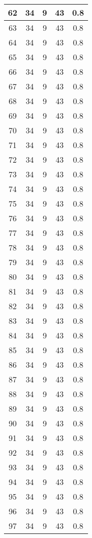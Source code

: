 \documentclass[letterpaper, 12pt]{article}
\begin{document}
\begin{longtable}{|c|c|c|c|c|}
\hline
62 & 34 & 9 & 43 & 0.8 \\
\hline
63 & 34 & 9 & 43 & 0.8 \\
\hline
64 & 34 & 9 & 43 & 0.8 \\
\hline
65 & 34 & 9 & 43 & 0.8 \\
\hline
66 & 34 & 9 & 43 & 0.8 \\
\hline
67 & 34 & 9 & 43 & 0.8 \\
\hline
68 & 34 & 9 & 43 & 0.8 \\
\hline
69 & 34 & 9 & 43 & 0.8 \\
\hline
70 & 34 & 9 & 43 & 0.8 \\
\hline
71 & 34 & 9 & 43 & 0.8 \\
\hline
72 & 34 & 9 & 43 & 0.8 \\
\hline
73 & 34 & 9 & 43 & 0.8 \\
\hline
74 & 34 & 9 & 43 & 0.8 \\
\hline
75 & 34 & 9 & 43 & 0.8 \\
\hline
76 & 34 & 9 & 43 & 0.8 \\
\hline
77 & 34 & 9 & 43 & 0.8 \\
\hline
78 & 34 & 9 & 43 & 0.8 \\
\hline
79 & 34 & 9 & 43 & 0.8 \\
\hline
80 & 34 & 9 & 43 & 0.8 \\
\hline
81 & 34 & 9 & 43 & 0.8 \\
\hline
82 & 34 & 9 & 43 & 0.8 \\
\hline
83 & 34 & 9 & 43 & 0.8 \\
\hline
84 & 34 & 9 & 43 & 0.8 \\
\hline
85 & 34 & 9 & 43 & 0.8 \\
\hline
86 & 34 & 9 & 43 & 0.8 \\
\hline
87 & 34 & 9 & 43 & 0.8 \\
\hline
88 & 34 & 9 & 43 & 0.8 \\
\hline
89 & 34 & 9 & 43 & 0.8 \\
\hline
90 & 34 & 9 & 43 & 0.8 \\
\hline
91 & 34 & 9 & 43 & 0.8 \\
\hline
92 & 34 & 9 & 43 & 0.8 \\
\hline
93 & 34 & 9 & 43 & 0.8 \\
\hline
94 & 34 & 9 & 43 & 0.8 \\
\hline
95 & 34 & 9 & 43 & 0.8 \\
\hline
96 & 34 & 9 & 43 & 0.8 \\
\hline
97 & 34 & 9 & 43 & 0.8 \\

\end{longtable}
\end{document}
